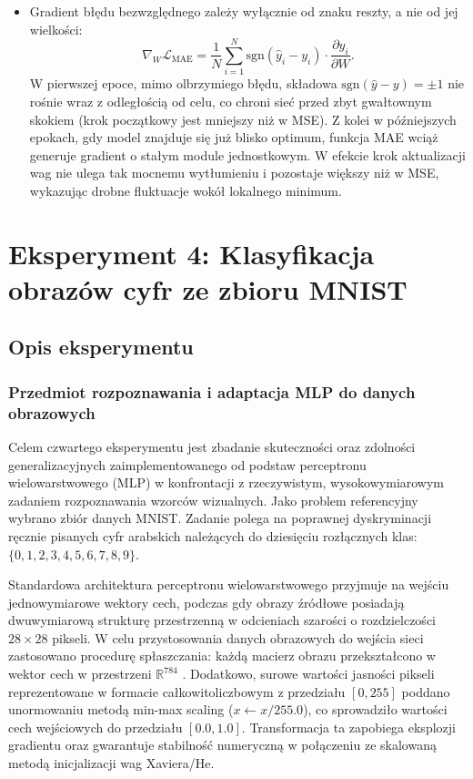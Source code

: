 \documentclass[11pt,a4paper]{article}
\begin{document}
\begin{enumerate}
\begin{itemize}
        \item Gradient błędu bezwzględnego zależy wyłącznie od znaku reszty, a nie od jej wielkości:
        \begin{equation}
            \nabla_W \mathcal{L}_{\text{MAE}} = \frac{1}{N} \sum_{i=1}^N \text{sgn}(\hat{y}_i - y_i) \cdot \frac{\partial \hat{y}_i}{\partial W}.
        \end{equation}
        W pierwszej epoce, mimo olbrzymiego błędu, składowa $\text{sgn}(\hat{y} - y) = \pm 1$ nie rośnie wraz z odległością od celu, co chroni sieć przed zbyt gwałtownym skokiem (krok początkowy jest mniejszy niż w MSE). Z kolei w późniejszych epokach, gdy model znajduje się już blisko optimum, funkcja MAE wciąż generuje gradient o stałym module jednostkowym. W efekcie krok aktualizacji wag nie ulega tak mocnemu wytłumieniu i pozostaje większy niż w MSE, wykazując drobne fluktuacje wokół lokalnego minimum.
    \end{itemize}
\end{enumerate}

\section{Eksperyment 4: Klasyfikacja obrazów cyfr ze zbioru MNIST}
\label{sec:exp_mnist}

\subsection{Opis eksperymentu}

\subsubsection{Przedmiot rozpoznawania i adaptacja MLP do danych obrazowych}
Celem czwartego eksperymentu jest zbadanie skuteczności oraz zdolności generalizacyjnych zaimplementowanego od podstaw perceptronu wielowarstwowego (MLP) w konfrontacji z rzeczywistym, wysokowymiarowym zadaniem rozpoznawania wzorców wizualnych. Jako problem referencyjny wybrano zbiór danych MNIST. Zadanie polega na poprawnej dyskryminacji ręcznie pisanych cyfr arabskich należących do dziesięciu rozłącznych klas: $\{0, 1, 2, 3, 4, 5, 6, 7, 8, 9\}$.

Standardowa architektura perceptronu wielowarstwowego przyjmuje na wejściu jednowymiarowe wektory cech, podczas gdy obrazy źródłowe posiadają dwuwymiarową strukturę przestrzenną w odcieniach szarości o rozdzielczości $28 \times 28$ pikseli. W celu przystosowania danych obrazowych do wejścia sieci zastosowano procedurę spłaszczania: każdą macierz obrazu przekształcono w wektor cech w przestrzeni $\mathbb{R}^{784}$ . Dodatkowo, surowe wartości jasności pikseli reprezentowane w formacie całkowitoliczbowym z przedziału $[0, 255]$ poddano unormowaniu metodą min-max scaling ($x \leftarrow x / 255.0$), co sprowadziło wartości cech wejściowych do przedziału $[0.0, 1.0]$. Transformacja ta zapobiega eksplozji gradientu oraz gwarantuje stabilność numeryczną w połączeniu ze skalowaną metodą inicjalizacji wag Xaviera/He.
\end{document}

